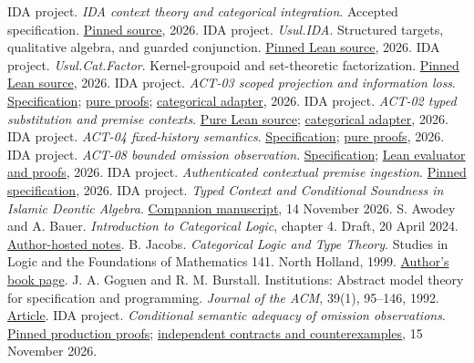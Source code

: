 \documentclass[11pt]{article}
\newcommand{\repo}[2]{\href{https://github.com/larsbx/usul-al-fiqh-deontic-circuits/blob/65062cec81255be893cba2fd722c99c904d8eec2/#1}{#2}}
\begin{document}
\begin{thebibliography}{99}
\small\raggedright
{} IDA project. \emph{IDA context theory and categorical integration}. Accepted specification. \repo{docs/research/ida-context-theory.md}{Pinned source}, 2026.
 IDA project. \emph{Usul.IDA}. Structured targets, qualitative algebra, and guarded conjunction. \repo{formal/lean/Usul/IDA.lean}{Pinned Lean source}, 2026.
 IDA project. \emph{Usul.Cat.Factor}. Kernel-groupoid and set-theoretic factorization. \repo{formal/lean/Usul/Cat/Factor.lean}{Pinned Lean source}, 2026.
 IDA project. \emph{ACT-03 scoped projection and information loss}. \repo{docs/research/ida-projection.md}{Specification}; \repo{formal/lean/Usul/Typing/IDAProjection.lean}{pure proofs}; \repo{formal/lean/Usul/Cat/IDAProjection.lean}{categorical adapter}, 2026.
 IDA project. \emph{ACT-02 typed substitution and premise contexts}. \repo{formal/lean/Usul/Typing/IDASubstitution.lean}{Pure Lean source}; \repo{formal/lean/Usul/Cat/IDASubstitution.lean}{categorical adapter}, 2026.
 IDA project. \emph{ACT-04 fixed-history semantics}. \repo{docs/research/ida-semantics.md}{Specification}; \repo{formal/lean/Usul/Typing/IDASemantics.lean}{pure proofs}, 2026.
 IDA project. \emph{ACT-08 bounded omission observation}. \repo{docs/research/ida-omission-coverage.md}{Specification}; \repo{formal/lean/Usul/Typing/IDAOmission.lean}{Lean evaluator and proofs}, 2026.
 IDA project. \emph{Authenticated contextual premise ingestion}. \repo{docs/research/ida-premise-ingestion.md}{Pinned specification}, 2026.
 IDA project. \emph{Typed Context and Conditional Soundness in Islamic Deontic Algebra}. \repo{docs/research/ida-context-theory-manuscript.md}{Companion manuscript}, 14 November 2026.
 S. Awodey and A. Bauer. \emph{Introduction to Categorical Logic}, chapter 4. Draft, 20 April 2024. \href{https://awodey.github.io/catlog/notes/catlog4.pdf}{Author-hosted notes}.
 B. Jacobs. \emph{Categorical Logic and Type Theory}. Studies in Logic and the Foundations of Mathematics 141. North Holland, 1999. \href{https://www.cs.ru.nl/B.Jacobs/CLT/bookinfo.html}{Author's book page}.
 J. A. Goguen and R. M. Burstall. Institutions: Abstract model theory for specification and programming. \emph{Journal of the ACM}, 39(1), 95--146, 1992. \href{https://courses.grainger.illinois.edu/cs522/sp2016/InstitutionsAbstractModelTheory.pdf}{Article}.
 IDA project. \emph{Conditional semantic adequacy of omission observations}. \href{https://github.com/larsbx/usul-al-fiqh-deontic-circuits/blob/784af396db0241c8c83da096d060740c93f4ff1d/formal/lean/Usul/Typing/IDAOmissionSemantics.lean}{Pinned production proofs}; \href{https://github.com/larsbx/usul-al-fiqh-deontic-circuits/blob/784af396db0241c8c83da096d060740c93f4ff1d/formal/lean/UsulTest/IDAOmissionSemantics.lean}{independent contracts and counterexamples}, 15 November 2026.
\end{thebibliography}
\end{document}
